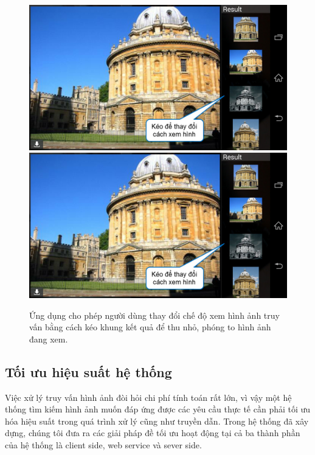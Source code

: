 \begin{figure}[!htbp]
  \begin{center}
    \leavevmode
    \ifpdf
      \includegraphics[scale=0.35]{interface_6}
    \else
      \includegraphics[scale=0.35]{interface_6}
    \fi
    \caption[Hình ảnh ứng dụng với chức năng thay đổi chế độ xem ảnh]{Ứng dụng cho phép người dùng thay đổi chế độ xem hình ảnh truy vấn bằng cách kéo khung kết quả để thu nhỏ, phóng to hình ảnh đang xem.}
    \label{FigInterface6}
  \end{center}
\end{figure}

\subsection{Tối ưu hiệu suất hệ thống}
\label{subsection:optimize}
Việc xử lý truy vấn hình ảnh đòi hỏi chi phí tính toán rất lớn, vì vậy một hệ thống tìm kiếm hình ảnh muốn đáp ứng được các yêu cầu thực tế cần phải tối ưu hóa hiệu suất trong quá trình xử lý cũng như truyền dẫn. Trong hệ thống đã xây dựng, chúng tôi đưa ra các giải pháp đề tối ưu hoạt động tại cả ba thành phần của hệ thống là client side, web service và sever side.

